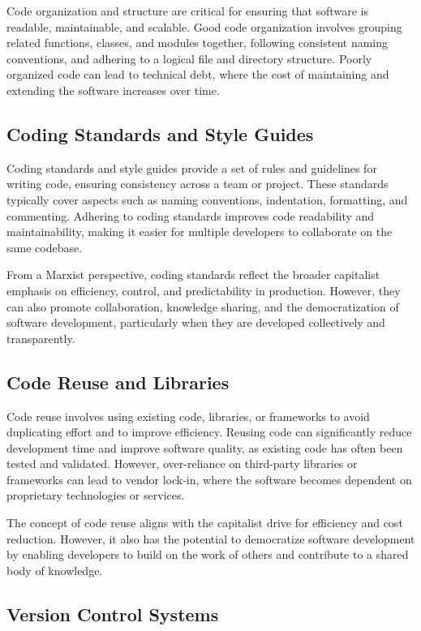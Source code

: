 \begin{refsection}
\begin{multicols}{2}
{Code organization and structure are critical for ensuring that software is readable, maintainable, and scalable. Good code organization involves grouping related functions, classes, and modules together, following consistent naming conventions, and adhering to a logical file and directory structure. Poorly organized code can lead to technical debt, where the cost of maintaining and extending the software increases over time.

\subsection{Coding Standards and Style Guides}

Coding standards and style guides provide a set of rules and guidelines for writing code, ensuring consistency across a team or project. These standards typically cover aspects such as naming conventions, indentation, formatting, and commenting. Adhering to coding standards improves code readability and maintainability, making it easier for multiple developers to collaborate on the same codebase.

From a Marxist perspective, coding standards reflect the broader capitalist emphasis on efficiency, control, and predictability in production. However, they can also promote collaboration, knowledge sharing, and the democratization of software development, particularly when they are developed collectively and transparently.

\subsection{Code Reuse and Libraries}

Code reuse involves using existing code, libraries, or frameworks to avoid duplicating effort and to improve efficiency. Reusing code can significantly reduce development time and improve software quality, as existing code has often been tested and validated. However, over-reliance on third-party libraries or frameworks can lead to vendor lock-in, where the software becomes dependent on proprietary technologies or services.

The concept of code reuse aligns with the capitalist drive for efficiency and cost reduction. However, it also has the potential to democratize software development by enabling developers to build on the work of others and contribute to a shared body of knowledge.

\subsection{Version Control Systems}

}
\end{multicols}
\end{refsection}
